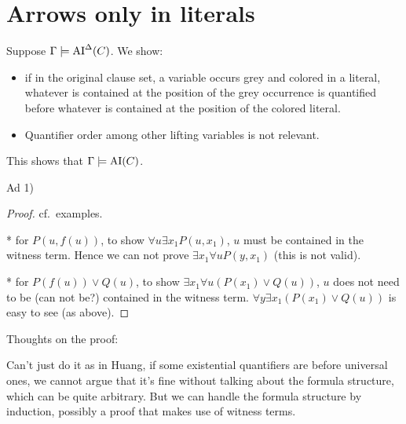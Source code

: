 \documentclass[,%
	paper=a4,%
	DIV10, %
	twoside=false,%
	liststotoc,
	bibtotoc,
	draft=false,%
	numbers=noendperiod
]{scrartcl}
\begin{document}
\section*{Arrows only in literals}


Suppose $\Gamma \models \operatorname{AI}^\Delta(C)$.
We show:
\begin{itemize}
		\item if in the original clause set, a variable occurs grey and colored in a literal, whatever is contained at the position of the grey occurrence is quantified before whatever is contained at the position of the colored literal.
	
	\item   Quantifier order among other lifting variables is not relevant.
\end{itemize}
This shows that $\Gamma \models \operatorname{AI}(C)$. 

Ad 1)

\begin{cprop}
\end{cprop}
\begin{proof}
	cf.~examples.

	* for $P(u, f(u))$, to show $\forall u \exists x_1 P(u, x_1)$, $u$ must be contained in the witness term.
	Hence we can not prove $\exists x_1 \forall u P(y, x_1)$ (this is not valid).

	* for $P(f(u)) \lor Q(u)$, to show $\exists x_1 \forall u (P(x_1) \lor Q(u))$, $u$ does not need to be (can not be?) contained in the witness term.
	$\forall y \exists x_1 (P(x_1) \lor Q(u))$ is easy to see (as above).
\end{proof}

Thoughts on the proof:

Can't just do it as in Huang, if some existential quantifiers are before universal ones, we cannot argue that it's fine without talking about the formula structure, which can be quite arbitrary. 
But we can handle the formula structure by induction, possibly a proof that makes use of witness terms. 
\end{document}
